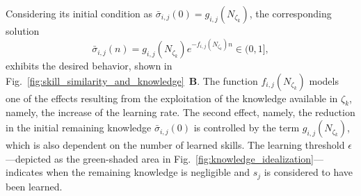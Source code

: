 \documentclass[12pt]{article}
\begin{document}
\noindent Considering its initial condition as $\bar{\sigma}_{i,j}(0) =  g_{i,j} \left(N_{\zeta_k}\right)$, the corresponding solution
\begin{equation}\label{eq:knowledge_exponential_form}
	\bar{\sigma}_{i,j}(n) = g_{i,j}(N_{\zeta_k}) e ^{-f_{i,j}\left(N_{\zeta_k}\right) n} \in (0,1],
\end{equation}
exhibits the desired behavior, shown in Fig.~\ref{fig:skill_similarity_and_knowledge}~\textbf{B}. The function $f_{i,j}\left(N_{\zeta_k}\right)$ models one of the effects resulting from the exploitation of the knowledge available in $\zeta_k$, namely, the increase of the learning rate. The second effect, namely, the reduction in the initial remaining knowledge $\bar{\sigma}_{i,j}(0)$ is controlled by the term $g_{i,j}\left(N_{\zeta_k}\right)$, which is also dependent on the number of learned skills. The learning threshold $\epsilon$---depicted as the green-shaded area in Fig.~\ref{fig:knowledge_idealization}---indicates when the remaining knowledge is negligible and $s_{j}$ is considered to have been learned.
\end{document}
